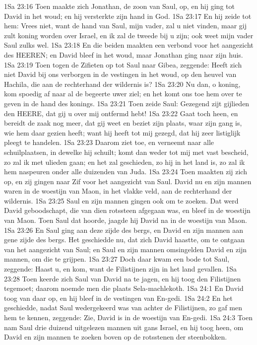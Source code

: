 1Sa 23:16  Toen maakte zich Jonathan, de zoon van Saul, op, en hij ging tot David in het woud; en hij versterkte zijn hand in God.
1Sa 23:17  En hij zeide tot hem: Vrees niet, want de hand van Saul, mijn vader, zal u niet vinden, maar gij zult koning worden over Israel, en ik zal de tweede bij u zijn; ook weet mijn vader Saul zulks wel.
1Sa 23:18  En die beiden maakten een verbond voor het aangezicht des HEEREN; en David bleef in het woud, maar Jonathan ging naar zijn huis.
1Sa 23:19  Toen togen de Zifieten op tot Saul naar Gibea, zeggende: Heeft zich niet David bij ons verborgen in de vestingen in het woud, op den heuvel van Hachila, die aan de rechterhand der wildernis is?
1Sa 23:20  Nu dan, o koning, kom spoedig af naar al de begeerte uwer ziel; en het komt ons toe hem over te geven in de hand des konings.
1Sa 23:21  Toen zeide Saul: Gezegend zijt gijlieden den HEERE, dat gij u over mij ontfermd hebt!
1Sa 23:22  Gaat toch heen, en bereidt de zaak nog meer, dat gij weet en beziet zijn plaats, waar zijn gang is, wie hem daar gezien heeft; want hij heeft tot mij gezegd, dat hij zeer listiglijk pleegt te handelen.
1Sa 23:23  Daarom ziet toe, en verneemt naar alle schuilplaatsen, in dewelke hij schuilt; komt dan weder tot mij met vast bescheid, zo zal ik met ulieden gaan; en het zal geschieden, zo hij in het land is, zo zal ik hem naspeuren onder alle duizenden van Juda.
1Sa 23:24  Toen maakten zij zich op, en zij gingen naar Zif voor het aangezicht van Saul. David nu en zijn mannen waren in de woestijn van Maon, in het vlakke veld, aan de rechterhand der wildernis.
1Sa 23:25  Saul en zijn mannen gingen ook om te zoeken. Dat werd David geboodschapt, die van dien rotssteen afgegaan was, en bleef in de woestijn van Maon. Toen Saul dat hoorde, jaagde hij David na in de woestijn van Maon.
1Sa 23:26  En Saul ging aan deze zijde des bergs, en David en zijn mannen aan gene zijde des bergs. Het geschiedde nu, dat zich David haastte, om te ontgaan van het aangezicht van Saul; en Saul en zijn mannen omsingelden David en zijn mannen, om die te grijpen.
1Sa 23:27  Doch daar kwam een bode tot Saul, zeggende: Haast u, en kom, want de Filistijnen zijn in het land gevallen.
1Sa 23:28  Toen keerde zich Saul van David na te jagen, en hij toog den Filistijnen tegemoet; daarom noemde men die plaats Sela-machlekoth.
1Sa 24:1  En David toog van daar op, en hij bleef in de vestingen van En-gedi.
1Sa 24:2  En het geschiedde, nadat Saul wedergekeerd was van achter de Filistijnen, zo gaf men hem te kennen, zeggende: Zie, David is in de woestijn van En-gedi.
1Sa 24:3  Toen nam Saul drie duizend uitgelezen mannen uit gans Israel, en hij toog heen, om David en zijn mannen te zoeken boven op de rotsstenen der steenbokken.
